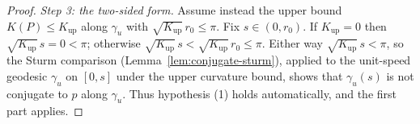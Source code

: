 \begin{proof}
\emph{Step 3: the two-sided form.} Assume instead the upper bound $K(P)\le
K_{\mathrm{up}}$ along $\gamma_u$ with $\sqrt{K_{\mathrm{up}}}\,r_0\le\pi$. Fix
$s\in(0,r_0)$. If $K_{\mathrm{up}}=0$ then $\sqrt{K_{\mathrm{up}}}\,s=0<\pi$;
otherwise $\sqrt{K_{\mathrm{up}}}\,s<\sqrt{K_{\mathrm{up}}}\,r_0\le\pi$. Either
way $\sqrt{K_{\mathrm{up}}}\,s<\pi$, so the Sturm comparison
(Lemma~\ref{lem:conjugate-sturm}), applied to the unit-speed geodesic $\gamma_u$
on $[0,s]$ under the upper curvature bound, shows that $\gamma_u(s)$ is not
conjugate to $p$ along $\gamma_u$. Thus hypothesis (1) holds automatically, and
the first part applies.
\end{proof}


